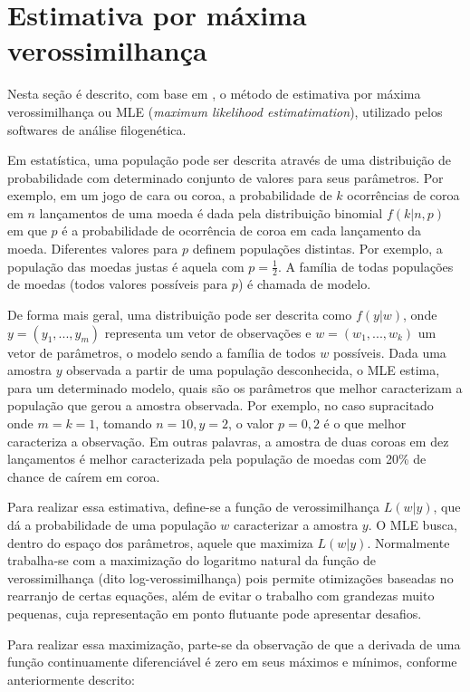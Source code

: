 \documentclass[cic,tc]{iiufrgs}
\begin{document}
\section{Estimativa por máxima verossimilhança}
\label{sec:mle}

Nesta seção é descrito, com base em \cite{myung2003tutorial}, o método de
estimativa por máxima verossimilhança ou MLE (\textit{maximum likelihood
estimatimation}), utilizado pelos softwares de análise filogenética.

Em estatística, uma população pode ser descrita através de uma distribuição de
probabilidade com determinado conjunto de valores para seus parâmetros.
Por exemplo, em um jogo de cara ou coroa, a probabilidade de $k$ ocorrências de
coroa em $n$ lançamentos de uma moeda é dada pela distribuição binomial
$f(k|n,p)$ em que $p$ é a probabilidade de ocorrência de coroa em cada
lançamento da moeda. Diferentes valores para $p$ definem populações distintas.
Por exemplo, a população das moedas justas é aquela com $p = \frac{1}{2}$. A
família de todas populações de moedas (todos valores possíveis para $p$) é
chamada de modelo.

De forma mais geral, uma distribuição pode ser descrita como $f(y|w)$, onde $y
= (y_1, ..., y_m)$ representa um vetor de observações e $w = (w_1, ..., w_k)$
um vetor de parâmetros, o modelo sendo a família de todos $w$ possíveis. Dada
uma amostra $y$ observada a partir de uma população desconhecida, o MLE estima,
para um determinado modelo, quais são os parâmetros que melhor caracterizam a
população que gerou a amostra observada. Por exemplo, no caso supracitado
onde $m = k = 1$, tomando $n = 10, y = 2$, o valor $p = 0{,}2$ é o que melhor
caracteriza a observação. Em outras palavras, a amostra de duas coroas em dez
lançamentos é melhor caracterizada pela população de moedas com 20\% de chance
de caírem em coroa.

Para realizar essa estimativa, define-se a função de verossimilhança $L(w|y)$,
que dá a probabilidade de uma população $w$ caracterizar a amostra $y$. O MLE
busca, dentro do espaço dos parâmetros, aquele que maximiza $L(w|y)$.
Normalmente trabalha-se com a maximização do logaritmo natural da função de
verossimilhança (dito log-verossimilhança) pois permite otimizações baseadas no
rearranjo de certas equações, além de evitar o trabalho com grandezas muito
pequenas, cuja representação em ponto flutuante pode apresentar desafios. 

Para realizar essa maximização, parte-se da observação de que a derivada de uma
função continuamente diferenciável é zero em seus máximos e mínimos, conforme
anteriormente descrito:
\end{document}

